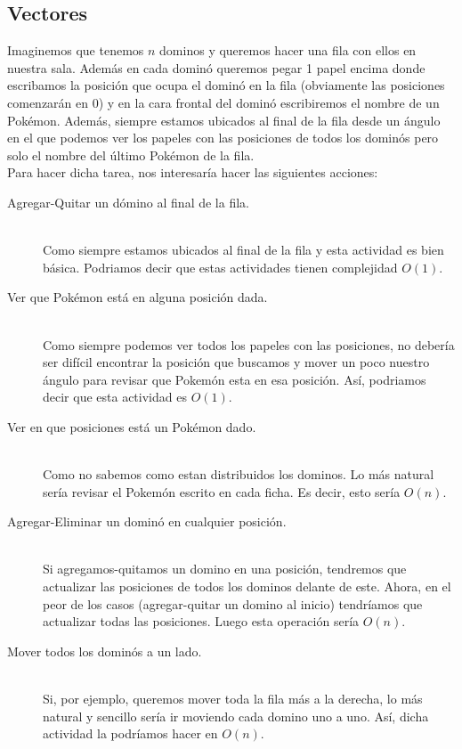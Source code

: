 \documentclass[a4paper,12pt]{article}
\begin{document}
\subsection*{Vectores}
Imaginemos que tenemos $n$ dominos y queremos hacer una fila con ellos en nuestra sala. Además en cada dominó queremos pegar 1 papel encima donde escribamos la posición que ocupa el dominó en la fila (obviamente las posiciones comenzarán en 0) y en la cara frontal del dominó escribiremos el nombre de un Pokémon. Además, siempre estamos ubicados al final de la fila desde un ángulo en el que podemos ver los papeles con las posiciones de todos los dominós pero solo el nombre del último Pokémon de la fila.\\
Para hacer dicha tarea, nos interesaría hacer las siguientes acciones:
\begin{description}
\item[Agregar-Quitar un dómino al final de la fila.]\hfill \\ Como siempre estamos ubicados al final de la fila y esta actividad es bien básica. Podriamos decir que estas actividades tienen complejidad $O(1)$.
\item[Ver que Pokémon está en alguna posición dada.]\hfill \\ Como siempre podemos ver todos los papeles con las posiciones, no debería ser difícil encontrar la posición que buscamos y mover un poco nuestro ángulo para revisar que Pokemón esta en esa posición. Así, podriamos decir que esta actividad es $O(1)$.
\item[Ver en que posiciones está un Pokémon dado.]\hfill \\Como no sabemos como estan distribuidos los dominos. Lo más natural sería revisar el Pokemón escrito en cada ficha. Es decir, esto sería $O(n)$.
\item[Agregar-Eliminar un dominó en cualquier posición.] \hfill \\ Si agregamos-quitamos un domino en una posición, tendremos que actualizar las posiciones de todos los dominos delante de este. Ahora, en el peor de los casos (agregar-quitar un domino al inicio) tendríamos que actualizar todas las posiciones. Luego esta operación sería $O(n)$.
\item[Mover todos los dominós a un lado.]\hfill \\ Si, por ejemplo, queremos mover toda la fila más a la derecha, lo más natural y sencillo sería ir moviendo cada domino uno a uno. Así, dicha actividad la podríamos hacer en $O(n)$.
\end{description}
\end{document}

